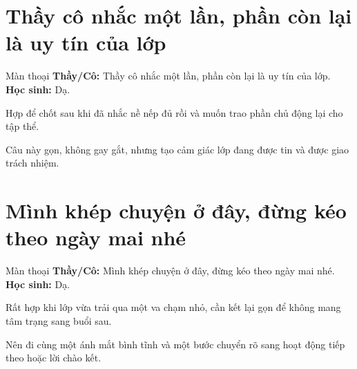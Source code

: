 \section{Thầy cô nhắc một lần, phần còn lại là uy tín của lớp}
\begin{manthoai}{Màn thoại}
\textbf{Thầy/Cô:} Thầy cô nhắc một lần, phần còn lại là uy tín của lớp.\\
\textbf{Học sinh:} Dạ.
\end{manthoai}
\begin{dungkhinào}
Hợp để chốt sau khi đã nhắc nề nếp đủ rồi và muốn trao phần chủ động lại cho tập thể.
\end{dungkhinào}
\begin{nhipthem}
Câu này gọn, không gay gắt, nhưng tạo cảm giác lớp đang được tin và được giao trách nhiệm.
\end{nhipthem}
\ngancach

\section{Mình khép chuyện ở đây, đừng kéo theo ngày mai nhé}
\begin{manthoai}{Màn thoại}
\textbf{Thầy/Cô:} Mình khép chuyện ở đây, đừng kéo theo ngày mai nhé.\\
\textbf{Học sinh:} Dạ.
\end{manthoai}
\begin{dungkhinào}
Rất hợp khi lớp vừa trải qua một va chạm nhỏ, cần kết lại gọn để không mang tâm trạng sang buổi sau.
\end{dungkhinào}
\begin{nhipthem}
Nên đi cùng một ánh mắt bình tĩnh và một bước chuyển rõ sang hoạt động tiếp theo hoặc lời chào kết.
\end{nhipthem}
